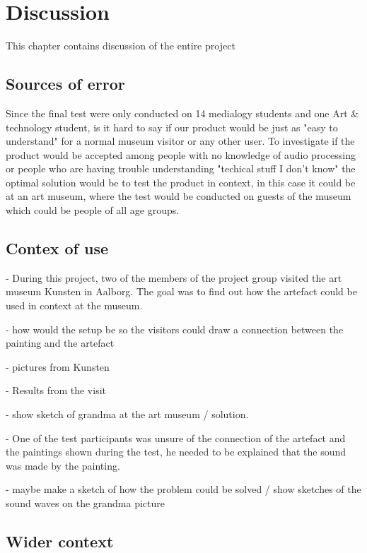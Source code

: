 \chapter{Discussion}\label{ch:discussion}
This chapter contains discussion of the entire project 

\section{Sources of error}

 Since the final test were only conducted on 14 medialogy students and one Art \& technology student, is it hard to say if our product would be just as "easy to understand" for a normal museum visitor or any other user. To investigate if the product would be accepted among people with no knowledge of audio processing or people who are having trouble understanding "techical stuff I don't know" the optimal solution would be to test the product in context, in this case it could be at an art museum, where the test would be conducted on guests of the museum which could be people of all age groups. 
 
 \section{Contex of use}
 - During this project, two of the members of the project group visited the art museum Kunsten in Aalborg. The goal was to find out how the artefact could be used in context at the museum. 
 
 - how would the setup be so the visitors could draw a connection between the painting and the artefact 
 
 - pictures from Kunsten 
 
 - Results from the visit
 
 - show sketch of grandma at the art museum / solution. 
 
 - One of the test participants was unsure of the connection of the artefact and the paintings shown during the test, he needed to be explained that the sound was made by the painting.
 
 - maybe make a sketch of how the problem could be solved / show sketches of the sound waves on the grandma picture 
 
\section{Wider context}

